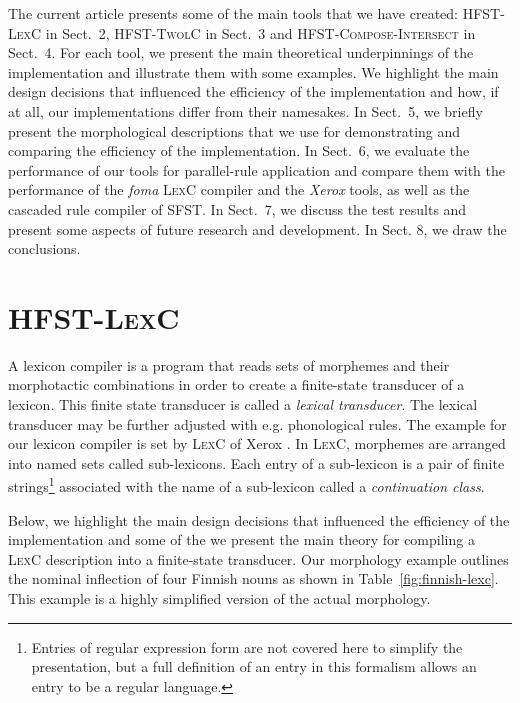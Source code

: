 \documentclass[postprint]{flammie}
\begin{document}
The current article presents some of the main tools that we have
created: \textsc{HFST-LexC} in Sect.~2, \textsc{HFST-TwolC} in Sect.~3
and \textsc{HFST-Compose-Inter\-sect} in Sect.~4. For each tool, we
present the main theoretical underpinnings of the implementation and
illustrate them with some examples.  We highlight the main design
decisions that influenced the efficiency of the implementation and
how, if at all, our implementations differ from their namesakes. In
Sect.~5, we briefly present the morphological descriptions that we use
for demonstrating and comparing the efficiency of the
implementation. In Sect.~6, we evaluate the performance of our tools
for parallel-rule application and compare them with the performance of
the \textit{foma} \textsc{LexC} compiler and the \textit{Xerox} tools,
as well as the cascaded rule compiler of \textsc{SFST}. In Sect.~7, we
discuss the test results and present some aspects of future research
and development. In Sect. 8, we draw the conclusions.

\section{\textsc{HFST-LexC}}
\label{sec:HFST-LexC}

A lexicon compiler is a program that reads sets of morphemes and their
morphotactic combinations in order to create a finite-state transducer
of a lexicon.  This finite state transducer is called a \emph{lexical
transducer}\cite{Karttunen94}.  The lexical transducer may be further
adjusted with e.g. phonological rules. The example for our lexicon
compiler is set by \textsc{LexC} of Xerox \cite{beesley03}.  In
\textsc{LexC}, morphemes are arranged into named sets called
sub-lexicons. Each entry of a sub-lexicon is a pair of finite
strings\footnote{Entries of regular expression form are not covered
here to simplify the presentation, but a full definition of an entry
in this formalism allows an entry to be a regular language.}
associated with the name of a sub-lexicon called a \emph{continuation
class}.  

Below, we highlight the main design decisions that influenced the
efficiency of the implementation and some of the we present the main
theory for compiling a \textsc{LexC} description into a finite-state
transducer. Our morphology example outlines the nominal inflection of
four Finnish nouns as shown in Table~\ref{fig:finnish-lexc}.  This
example is a highly simplified version of the actual morphology.
\end{document}
